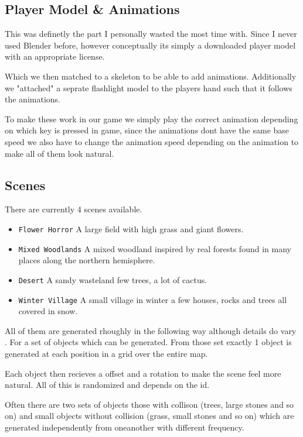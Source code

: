 \documentclass[11pt]{article}
\begin{document}
\subsection{Player Model \& Animations}
\par This was definetly the part I personally wasted the most time with. Since I never used Blender before, however conceptually its simply a downloaded player model with an appropriate license.
\par Which we then matched to a skeleton to be able to add animations. Additionally we "attached" a seprate flashlight model to the players hand such that it follows the animations.
\par To make these work in our game we simply play the correct animation depending on which key is pressed in game, since the animations dont have the same base speed we also have to change the animation speed depending on the animation to make all of them look natural.

\subsection{Scenes}
\pare There are currently 4 scenes available. 
\begin{itemize}
	\item \texttt{Flower Horror} A large field with high grass and giant flowers.
	\item \texttt{Mixed Woodlands} A mixed woodland inspired by real forests found in many places along the northern hemisphere.
	\item \texttt{Desert} A sandy wasteland few trees, a lot of cactus.
	\item \texttt{Winter Village} A small village in winter a few houses, rocks and trees all covered in snow.
\end{itemize}
\par All of them are generated rhoughly in the following way although details do vary . For a set of objects which can be generated. From those set exactly 1 object is generated at each position in a grid over the entire map. 
\par Each object then recieves a offset and a rotation to make the scene feel more natural. All of this is randomized and depends on the id. 
\par Often there are two sets of objects those with collison (trees, large stones and so on) and small objects without collision (grass, small stones and so on) which are generated independently from oneanother with different frequency.
\end{document}

